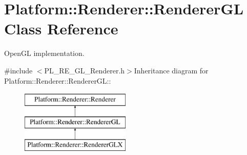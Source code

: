 \hypertarget{classPlatform_1_1Renderer_1_1RendererGL}{
\section{Platform::Renderer::RendererGL Class Reference}
\label{classPlatform_1_1Renderer_1_1RendererGL}
}


OpenGL implementation.  


{\ttfamily \#include $<$PL\_\-RE\_\-GL\_\-Renderer.h$>$}Inheritance diagram for Platform::Renderer::RendererGL::\begin{figure}[H]
\begin{center}
\leavevmode
\includegraphics[height=3cm]{classPlatform_1_1Renderer_1_1RendererGL}
\end{center}
\end{figure}
